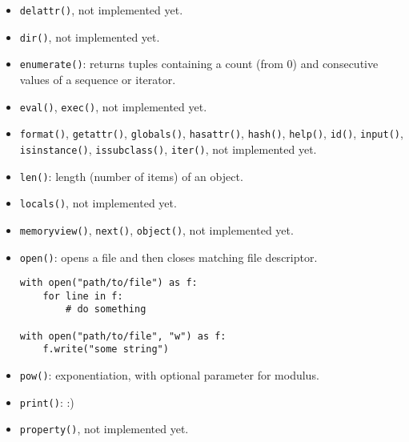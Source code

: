 \begin{itemize}
\item
\texttt{delattr()},
\dotfill not implemented yet.

\item
\texttt{dir()},
\dotfill not implemented yet.


\item \texttt{enumerate()}: returns tuples containing a count (from 0) and consecutive values of a sequence or iterator.

\item
\texttt{eval()},
\texttt{exec()},
\dotfill not implemented yet.

\item
\texttt{format()},
\texttt{getattr()},
\texttt{globals()},
\texttt{hasattr()},
\texttt{hash()},
\texttt{help()},
\texttt{id()},
\texttt{input()},
\texttt{isinstance()},
\texttt{issubclass()},
\texttt{iter()},
\dotfill not implemented yet.

\item \texttt{len()}: length (number of items) of an object.

\item
\texttt{locals()},
\dotfill not implemented yet.

\item
\texttt{memoryview()},
\texttt{next()},
\texttt{object()},
\dotfill not implemented yet.

\item \texttt{open()}: opens a file and then closes matching file descriptor.
\begin{verbatim}
with open("path/to/file") as f:
	for line in f:
		# do something

with open("path/to/file", "w") as f:
	f.write("some string")
\end{verbatim}

\item \texttt{pow()}: exponentiation, with optional parameter for modulus.

\item \texttt{print()}: :)

\item
\texttt{property()},
\dotfill not implemented yet.


\end{itemize}
